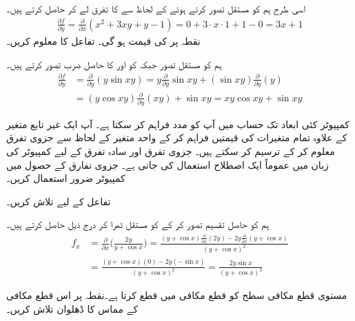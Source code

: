 اسی طرح ہم  کو مستقل تصور کرتے ہوئے  کے لحاظ سے  کا تفرق لے کر    حاصل کرتے ہیں۔
\begin{align*}
\frac{\partial f}{\partial y}=\frac{\partial}{\partial x}(x^2+3xy+y-1)=0+3\cdot x\cdot 1+1-0=3x+1
\end{align*}
نقطہ  پر  کی قیمت  ہو گی۔
تفاعل  کا  معلوم کریں۔

ہم  کو مستقل  تصور جبکہ   کو  اور  کا حاصل ضرب تصور کرتے ہیں۔
\begin{align*}
\frac{\partial f}{\partial y}&=\frac{\partial}{\partial y}(y\sin xy)=y\frac{\partial}{\partial y}\sin xy+(\sin xy)\frac{\partial}{\partial y}(y)\\
&=(y\cos xy)\frac{\partial}{\partial y}(xy) +\sin xy=xy\cos xy+\sin xy
\end{align*}

\quad
 کمپیوٹر  کئی ابعاد تک  حساب میں   آپ کو   مدد فراہم کر سکتا ہے۔ آپ ایک غیر تابع متغیر کے علاوہ تمام متغیرات کی قیمتیں فراہم کر کے واحد  متغیر کے لحاظ سے جزوی تفرق معلوم کر  کے  ترسیم کر سکتے ہیں۔ جزوی تفرق اور سادہ تفرق کے لیے کمپیوٹر کی زبان میں عموماً  ایک    اصطلاح استعمال کی جاتی ہے۔  جزوی تفارق کے حصول میں کمپیوٹر ضرور استعمال کریں۔

تفاعل  کے لیے  تلاش کریں۔

ہم  کو حاصل تقسیم تصور کر کے  کو مستقل ٹھرا  کر درج ذیل حاصل کرتے ہیں۔
\begin{align*}
f_x&=\frac{\partial}{\partial x}\big(\frac{2y}{y+\cos x}\big)=\frac{(y+\cos x)\tfrac{\partial}{\partial x}(2y)-2y\tfrac{\partial}{\partial x}(y+\cos x)}{(y+\cos x)^2}\\
&=\frac{(y+\cos x)(0)-2y(-\sin x)}{(y+\cos x)^2}=\frac{2y\sin x}{(y+\cos x)^2}
\end{align*}

مستوی  قطع مکافی سطح   کو قطع مکافی میں قطع کرتا ہے۔نقطہ  پر اس قطع مکافی کے مماس کا ڈھلوان تلاش کریں۔

